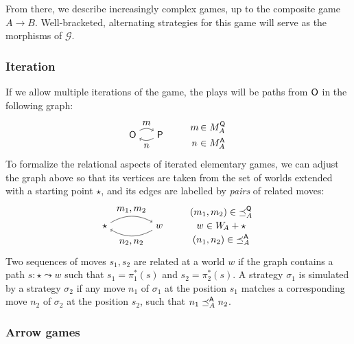 From there, we describe increasingly complex games,
up to the composite game $A \rightarrow B$.
Well-bracketed, alternating strategies for this game
will serve as the morphisms of $\mathcal{G}$.

\subsubsection{Iteration}

If we allow multiple iterations of the game,
the plays will be paths from $ \mathsf{O} $ in the following graph:
\[
  \begin{tikzpicture}[baseline=(O.base)]
    \node (O) at (0,0) {\kw{O}};
    \node (P) at (1,0) {\kw{P}};
    \path [->] (O) edge[bend left] node[auto] {$m$} (P);
    \path [->] (P) edge[bend left] node[auto] {$n$} (O);
  \end{tikzpicture}
  \qquad
  \begin{array}{c@{\,}l}
    m &\in M_A^\kw{Q} \\[1ex]
    n &\in M_A^\kw{A}
  \end{array}
\]
To formalize the relational aspects of iterated elementary games,
we can adjust the graph above so that its vertices are taken
from the set of worlds extended with a starting point $\star$,
and its edges are labelled by \emph{pairs} of related moves:
\[
  \begin{tikzpicture}[baseline=(O.base)]
    \node (O) at (0,0) {$\star$};
    \node (P) at (2,0) {$w$};
    \path [->] (O) edge[bend left] node[auto] {$m_1, m_2$} (P);
    \path [->] (P) edge[bend left] node[auto] {$n_2, n_2$} (O);
  \end{tikzpicture}
  \qquad
  \begin{array}{c}
    (m_1, m_2) \in {\preceq}_A^\kw{Q} \\[.5ex]
    w \in W_{\!A} + \star \\[.5ex]
    (n_1, n_2) \in {\preceq}_A^\kw{A}
  \end{array}
\]
Two sequences of moves $s_1, s_2$
are related at a world $w$
if the graph contains a path $s : \star \leadsto w$
such that $s_1 = \pi_1^*(s)$ and $s_2 = \pi_2^*(s)$.
A strategy $\sigma_1$ is simulated by a strategy $\sigma_2$ if
any move $n_1$ of $\sigma_1$ at the position $s_1$
matches a corresponding move $n_2$ of $\sigma_2$ at the position $s_2$,
such that $n_1 \preceq_A^{ \mathsf{A} } n_2$.

\subsubsection{Arrow games}

